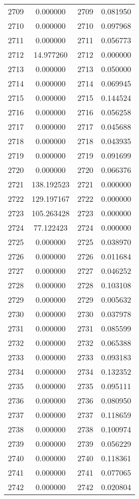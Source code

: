 \documentclass[12pt]{article}
\begin{document}
\begin{longtable}{@{}cccc@{}}
2709 & 0.000000 & 2709 & 0.081950 \\
2710 & 0.000000 & 2710 & 0.097968 \\
2711 & 0.000000 & 2711 & 0.056773 \\
2712 & 14.977260 & 2712 & 0.000000 \\
2713 & 0.000000 & 2713 & 0.050000 \\
2714 & 0.000000 & 2714 & 0.069945 \\
2715 & 0.000000 & 2715 & 0.144524 \\
2716 & 0.000000 & 2716 & 0.056258 \\
2717 & 0.000000 & 2717 & 0.045688 \\
2718 & 0.000000 & 2718 & 0.043935 \\
2719 & 0.000000 & 2719 & 0.091699 \\
2720 & 0.000000 & 2720 & 0.066376 \\
2721 & 138.192523 & 2721 & 0.000000 \\
2722 & 129.197167 & 2722 & 0.000000 \\
2723 & 105.263428 & 2723 & 0.000000 \\
2724 & 77.122423 & 2724 & 0.000000 \\
2725 & 0.000000 & 2725 & 0.038970 \\
2726 & 0.000000 & 2726 & 0.011684 \\
2727 & 0.000000 & 2727 & 0.046252 \\
2728 & 0.000000 & 2728 & 0.103108 \\
2729 & 0.000000 & 2729 & 0.005632 \\
2730 & 0.000000 & 2730 & 0.037978 \\
2731 & 0.000000 & 2731 & 0.085599 \\
2732 & 0.000000 & 2732 & 0.065388 \\
2733 & 0.000000 & 2733 & 0.093183 \\
2734 & 0.000000 & 2734 & 0.132352 \\
2735 & 0.000000 & 2735 & 0.095111 \\
2736 & 0.000000 & 2736 & 0.080950 \\
2737 & 0.000000 & 2737 & 0.118659 \\
2738 & 0.000000 & 2738 & 0.100974 \\
2739 & 0.000000 & 2739 & 0.056229 \\
2740 & 0.000000 & 2740 & 0.118361 \\
2741 & 0.000000 & 2741 & 0.077065 \\
2742 & 0.000000 & 2742 & 0.020804 \\

\end{longtable}
\end{document}
